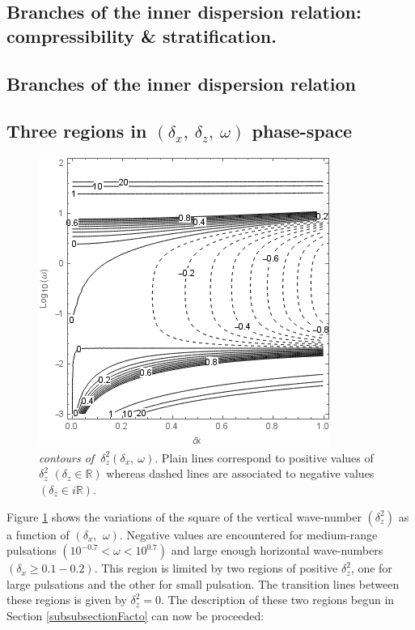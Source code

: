 \documentclass[a4paper,11pt]{article}
\begin{document}
\subsection{Branches of the inner dispersion relation: compressibility \& stratification.}
\subsection{}
\subsection{Branches of the inner dispersion relation}
\subsection{Three regions in $(\delta_x,\ \delta_z,\ \omega)$ phase-space}
\label{SubSectionDeltaz}
\begin{figure}[!h]
	\centering	
	\includegraphics[width=0.5\linewidth]{FIGURES/Contour_dz.png}
	\caption{\textit{contours of $\ \delta_z^2(\delta_x,\ \omega)$}. Plain lines correspond to positive values of $\delta_z^2$ $(\delta_z\in\mathbb{R})$ whereas dashed lines are associated to negative values $(\delta_z\in i\mathbb{R})$.}
	\label{FigContourdz}
\end{figure}
Figure \ref{FigContourdz} shows the variations of the square of the vertical wave-number $(\delta_z^2)$ as a function of $(\delta_x,\ \,\omega)$.  Negative values are encountered for medium-range pulsations $(10^{-0.7}<\omega<10^{0.7})$ and large enough horizontal wave-numbers $(\delta_x \geq 0.1-0.2)$. This region is limited by two regions of positive $\delta_z^2$, one for large pulsations and the other for small pulsation. The transition lines between these regions is given by $\delta_z^2=0$. The description of these two regions begun in Section \ref{subsubsectionFacto} can now be proceeded:
\end{document}
